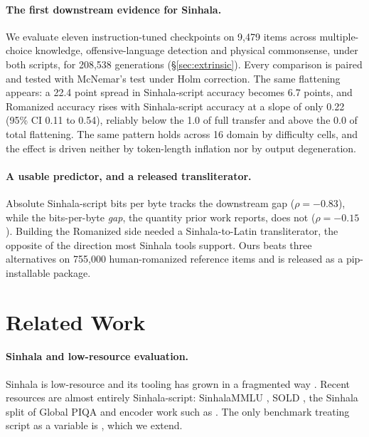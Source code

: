\documentclass[11pt]{article}
\begin{document}
\paragraph{The first downstream evidence for Sinhala.}
We evaluate eleven instruction-tuned checkpoints on 9{,}479 items across
multiple-choice knowledge, offensive-language detection and physical commonsense,
under both scripts, for 208{,}538 generations (\S\ref{sec:extrinsic}). Every
comparison is paired and tested with McNemar's test under Holm correction. The same
flattening appears: a 22.4 point spread in Sinhala-script accuracy becomes 6.7
points, and Romanized accuracy rises with Sinhala-script accuracy at a slope of only
0.22 (95\% CI 0.11 to 0.54), reliably below the 1.0 of full transfer and above the
0.0 of total flattening. The same pattern holds across 16 domain by difficulty
cells, and the effect is driven neither by token-length inflation nor by output
degeneration.

\paragraph{A usable predictor, and a released transliterator.}
Absolute Sinhala-script bits per byte tracks the downstream gap
($\rho = -0.83$), while the bits-per-byte \emph{gap}, the quantity prior work
reports, does not ($\rho = -0.15$). Building the Romanized side needed a
Sinhala-to-Latin transliterator, the opposite of the direction most Sinhala tools
support. Ours beats three alternatives on 755{,}000 human-romanized reference items
and is released as a pip-installable package.


\section{Related Work}
\label{sec:related}

\paragraph{Sinhala and low-resource evaluation.}
Sinhala is low-resource and its tooling has grown in a fragmented way
\citep{desilva-2019-survey, ranathunga-de-silva-2022-languages,
joshi-etal-2020-state}. Recent resources are almost entirely Sinhala-script:
SinhalaMMLU \citep{pramodya-etal-2025-sinhalammlu}, SOLD
\citep{ranasinghe-etal-2025-sold}, the Sinhala split of Global PIQA
\citep{desilva-ranathunga-2026-sinhalapiqa, chang-etal-2025-globalpiqa} and
encoder work such as \citet{dhananjaya-etal-2022-bertifying}. The only benchmark
treating script as a variable is \citet{rajapakse-weerasinghe-2026-script},
which we extend.
\end{document}
